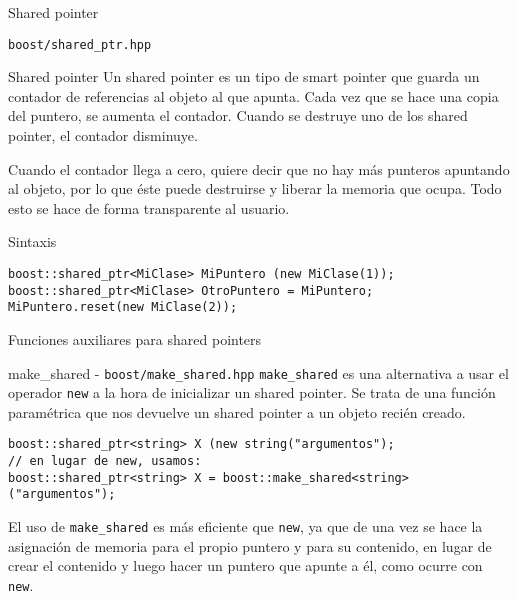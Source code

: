 \documentclass[8pt,xcolor=svgnames]{beamer}
\begin{document}
\begin{frame}[fragile]{Shared pointer}
  \begin{block}{}
    \texttt{boost/shared\_ptr.hpp}
  \end{block}
  
  \begin{block}{Shared pointer}
    Un shared pointer es un tipo de smart pointer que guarda un
    contador de referencias al objeto al que apunta. Cada vez que se
    hace una copia del puntero, se aumenta el contador. Cuando se
    destruye uno de los shared pointer, el contador disminuye. 

    \medskip

    Cuando el contador llega a cero, quiere decir que no hay más
    punteros apuntando al objeto, por lo que éste puede destruirse y
    liberar la memoria que ocupa. Todo esto se hace de forma
    transparente al usuario.

  \end{block}
  \pause
  \begin{block}{Sintaxis}
\begin{verbatim}
boost::shared_ptr<MiClase> MiPuntero (new MiClase(1));
boost::shared_ptr<MiClase> OtroPuntero = MiPuntero;
MiPuntero.reset(new MiClase(2));
\end{verbatim}
  \end{block}
\end{frame}

\begin{frame}[fragile]{Funciones auxiliares para shared pointers}
  \begin{block}{make\_shared - \texttt{boost/make\_shared.hpp}}
    \texttt{make\_shared} es una alternativa a usar el operador
    \texttt{new} a la hora de inicializar un shared pointer. Se trata
    de una función paramétrica que nos devuelve un shared pointer a un
    objeto recién creado.
{\small
\begin{verbatim}
boost::shared_ptr<string> X (new string("argumentos");
// en lugar de new, usamos:
boost::shared_ptr<string> X = boost::make_shared<string>("argumentos");
\end{verbatim}
} El uso de \texttt{make\_shared} es más eficiente que \texttt{new},
ya que de una vez se hace la asignación de memoria para el propio
puntero y para su contenido, en lugar de crear el contenido y luego
hacer un puntero que apunte a él, como ocurre con \texttt{new}.
  \end{block}
\end{frame}
\end{document}
